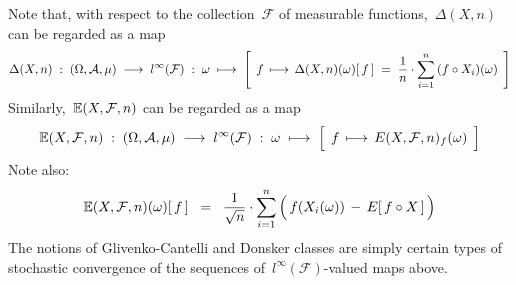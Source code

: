 \begin{remark}\mbox{}
\vskip 0.1cm
\noindent
Note that, with respect to the collection \,$\mathcal{F}$ of measurable functions,
\,$\Delta(X,n)$\, can be regarded as a map
\begin{equation*}
\Delta(X,n) \; : \; (\Omega,\mathcal{A},\mu) \;\longrightarrow\; l^{\infty}(\mathcal{F})
\; : \; \omega \;\longmapsto\;
	\left[\;\,
	f
	\,\overset{{\color{white}+}}{\longmapsto}\,
		\Delta(X,n)(\omega)[\,f\,]
		\;=\; \dfrac{1}{n}\cdot \overset{n}{\underset{i=1}{\sum}}\,(f \circ X_{i})(\omega)
	\,\;\right]
\end{equation*}
Similarly, \,$\mathbb{E}(X,\mathcal{F},n)$ can be regarded as a map
\begin{equation*}
\E(X,\mathcal{F},n) \; : \; (\Omega,\mathcal{A},\mu) \;\longrightarrow\; l^{\infty}(\mathcal{F})
\; : \; \omega \;\longmapsto\; \left[\;\, f \,\overset{{\color{white}+}}{\longmapsto}\, E(X,\mathcal{F},n)_{f}(\omega) \,\;\right]
\end{equation*}
Note also:
\begin{equation*}
\E(X,\mathcal{F},n)(\omega)[\,f\,]
\;\; = \;\;
	 \dfrac{1}{\sqrt{n}}
	 \cdot
	 \overset{n}{\underset{i=1}{\sum}}\left(\,f(X_{i}(\omega)) \,\overset{{\color{white}.}}{-}\, E[\,f \circ X\,]\,\right)
\end{equation*}
The notions of Glivenko-Cantelli and Donsker classes are simply certain types
of stochastic convergence of the sequences of \,$l^{\infty}(\mathcal{F})$-valued maps above.
\end{remark}


